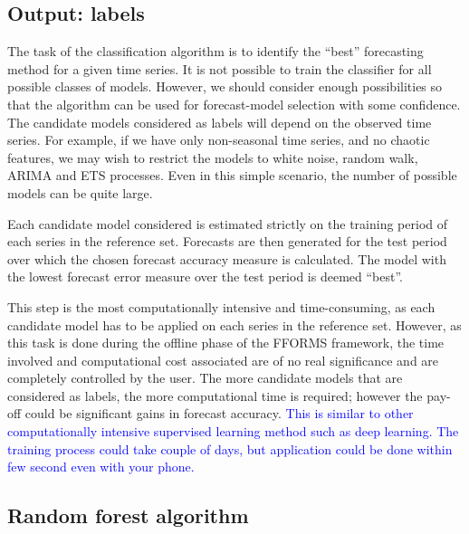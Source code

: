 \documentclass[11pt,a4paper,]{article}
\begin{document}
\hypertarget{output-labels}{%
\subsection{Output: labels}\label{output-labels}}

The task of the classification algorithm is to identify the ``best'' forecasting method for a given time series. It is not possible to train the classifier for all possible classes of models. However, we should consider enough possibilities so that the algorithm can be used for forecast-model selection with some confidence. The candidate models considered as labels will depend on the observed time series. For example, if we have only non-seasonal time series, and no chaotic features, we may wish to restrict the models to white noise, random walk, ARIMA and ETS processes. Even in this simple scenario, the number of possible models can be quite large.

Each candidate model considered is estimated strictly on the training period of each series in the reference set. Forecasts are then generated for the test period over which the chosen forecast accuracy measure is calculated. The model with the lowest forecast error measure over the test period is deemed ``best''.

This step is the most computationally intensive and time-consuming, as each candidate model has to be applied on each series in the reference set. However, as this task is done during the offline phase of the FFORMS framework, the time involved and computational cost associated are of no real significance and are completely controlled by the user. The more candidate models that are considered as labels, the more computational time is required; however the pay-off could be significant gains in forecast accuracy. \textcolor{blue}{This is similar to other computationally intensive supervised learning method such as deep learning. The training process could take couple of days, but application could be done within few second even with your phone.}

\hypertarget{random-forest-algorithm}{%
\subsection{Random forest algorithm}\label{random-forest-algorithm}}
\end{document}
